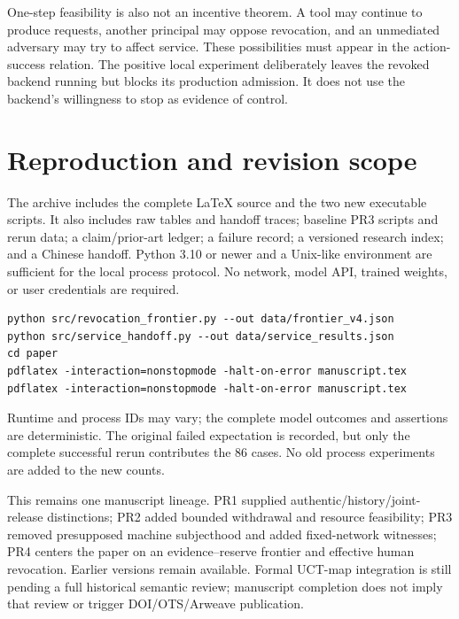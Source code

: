 \documentclass[11pt,a4paper]{article}
\theoremstyle{definition}\newtheorem{definition}{Definition}
\begin{document}
One-step feasibility is also not an incentive theorem. A tool may continue to produce requests, another principal may oppose revocation, and an unmediated adversary may try to affect service. These possibilities must appear in the action-success relation. The positive local experiment deliberately leaves the revoked backend running but blocks its production admission. It does not use the backend's willingness to stop as evidence of control.

\section{Reproduction and revision scope}
The archive includes the complete LaTeX source and the two new executable scripts. It also includes raw tables and handoff traces; baseline PR3 scripts and rerun data; a claim/prior-art ledger; a failure record; a versioned research index; and a Chinese handoff. Python 3.10 or newer and a Unix-like environment are sufficient for the local process protocol. No network, model API, trained weights, or user credentials are required.

\begin{lstlisting}
python src/revocation_frontier.py --out data/frontier_v4.json
python src/service_handoff.py --out data/service_results.json
cd paper
pdflatex -interaction=nonstopmode -halt-on-error manuscript.tex
pdflatex -interaction=nonstopmode -halt-on-error manuscript.tex
\end{lstlisting}
Runtime and process IDs may vary; the complete model outcomes and assertions are deterministic. The original failed expectation is recorded, but only the complete successful rerun contributes the 86 cases. No old process experiments are added to the new counts.

This remains one manuscript lineage. PR1 supplied authentic/history/joint-release distinctions; PR2 added bounded withdrawal and resource feasibility; PR3 removed presupposed machine subjecthood and added fixed-network witnesses; PR4 centers the paper on an evidence--reserve frontier and effective human revocation. Earlier versions remain available. Formal UCT-map integration is still pending a full historical semantic review; manuscript completion does not imply that review or trigger DOI/OTS/Arweave publication.
\end{document}
